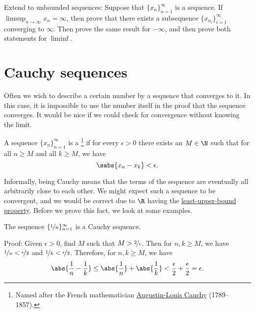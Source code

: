 \begin{exercise} \label{exercise:extendsubseqlimsupinf}
Extend  to unbounded sequences:
Suppose that $\{ x_n \}_{n=1}^\infty$ is a sequence.
If $\limsup_{n\to\infty} x_n = \infty$, then prove that
there exists a subsequence $\{ x_{n_i} \}_{i=1}^\infty$ converging to $\infty$.
Then prove the same result for $-\infty$, and then prove both statements for
$\liminf$.
\end{exercise}



\sectionnewpage
\section{Cauchy sequences}
\label{sec:cauchy}


Often we wish to describe a certain number 
by a sequence that converges to it.  In this case, it is impossible to use the
number itself in the proof that the sequence converges.
It would be nice if we could check for convergence without knowing
the limit.

\begin{defn}
A sequence $\{ x_n \}_{n=1}^\infty$ is a \emph{}%
\footnote{%
Named after the French mathematician
\href{https://en.wikipedia.org/wiki/Cauchy}{Augustin-Louis Cauchy} (1789--1857).} if
for every $\epsilon > 0$ there exists an $M \in \N$ such that
for all $n \geq M$ and all $k \geq M$, we have
\begin{equation*}
\sabs{x_n - x_k} < \epsilon .
\end{equation*}
\end{defn}

Informally, being Cauchy means that the terms of the sequence are eventually
all arbitrarily close to each other.  We might expect such a sequence to be
convergent, and we would be correct due to $\R$ having the
\hyperref[defn:lub]{least-upper-bound property}.  Before we prove this fact,
we look at some examples.

\begin{example}
The sequence $\{ \nicefrac{1}{n} \}_{n=1}^\infty$ is a Cauchy sequence.

Proof:  Given $\epsilon > 0$, find $M$ such that
$M > \nicefrac{2}{\epsilon}$.  Then for $n,k \geq M$,
we have $\nicefrac{1}{n} < \nicefrac{\epsilon}{2}$
and
$\nicefrac{1}{k} < \nicefrac{\epsilon}{2}$.  Therefore, for $n, k \geq M$,
we have
\begin{equation*}
\abs{\frac{1}{n} - \frac{1}{k}}
\leq
\abs{\frac{1}{n}} + \abs{\frac{1}{k}}
< \frac{\epsilon}{2} + \frac{\epsilon}{2} = \epsilon.
\end{equation*}
\end{example}


